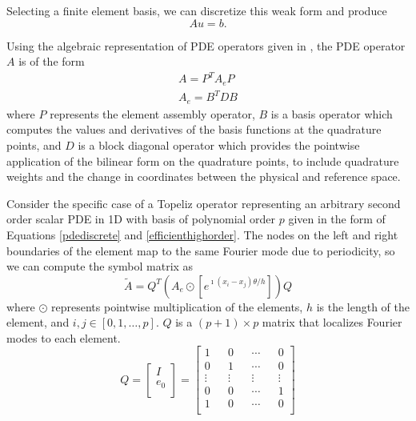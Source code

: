 \documentclass[review]{siamart190516}
\begin{document}
Selecting a finite element basis, we can discretize this weak form and produce
\begin{equation}\label{pdediscrete}
A u = b.
\end{equation}

Using the algebraic representation of PDE operators given in \cite{brown2010efficient}, the PDE operator $A$ is of the form
\begin{equation}\label{efficienthighorder}
\begin{split}
A = P^T A_e P\\
A_e = B^T D B
\end{split}
\end{equation}
where $P$ represents the element assembly operator, $B$ is a basis operator which computes the values and derivatives of the basis functions at the quadrature points, and $D$ is a block diagonal operator which provides the pointwise application of the bilinear form on the quadrature points, to include quadrature weights and the change in coordinates between the physical and reference space.

Consider the specific case of a Topeliz operator representing an arbitrary second order scalar PDE in 1D with basis of polynomial order $p$ given in the form of Equations \ref{pdediscrete} and \ref{efficienthighorder}.
The nodes on the left and right boundaries of the element map to the same Fourier mode due to periodicity, so we can compute the symbol matrix as
\begin{equation}\label{symbolscalar1d}
\tilde{A} = Q^T \left( A_e \odot \left[ e^{\imath \left( x_i - x_j \right) \theta / h} \right] \right) Q
\end{equation}
where $\odot$ represents pointwise multiplication of the elements, $h$ is the length of the element, and $i, j \in \left[ 0, 1, \dots, p\right]$.
$Q$ is a $\left( p + 1 \right) \times p$ matrix that localizes Fourier modes to each element.
\begin{equation}
Q =
\begin{bmatrix}
    I   \\
    e_0 \\
\end{bmatrix} =
\begin{bmatrix}
    1      && 0      && \cdots && 0      \\
    0      && 1      && \cdots && 0      \\
    \vdots && \vdots && \vdots && \vdots \\
    0      && 0      && \cdots && 1      \\
    1      && 0      && \cdots && 0      \\
\end{bmatrix}
\end{equation}
\end{document}
